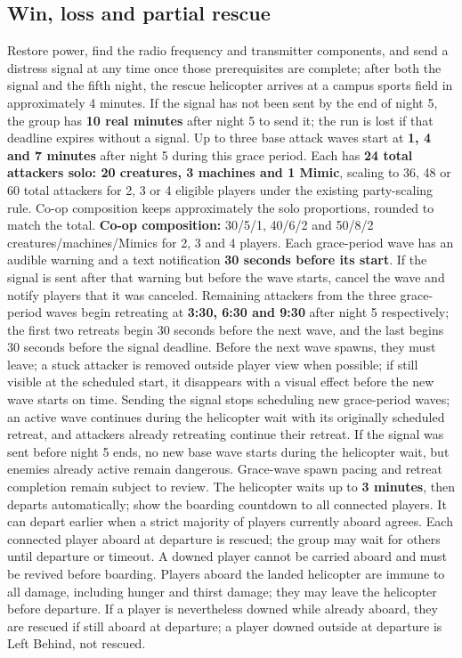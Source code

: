 \subsection{Win, loss and partial rescue}
Restore power, find the radio frequency and transmitter components, and send a distress signal at any time once those prerequisites are complete; after both the signal and the fifth night, the rescue helicopter arrives at a campus sports field in approximately 4 minutes. If the signal has not been sent by the end of night 5, the group has \textbf{10 real minutes} after night 5 to send it; the run is lost if that deadline expires without a signal. Up to three base attack waves start at \textbf{1, 4 and 7 minutes} after night 5 during this grace period. Each has \textbf{24 total attackers solo: 20 creatures, 3 machines and 1 Mimic}, scaling to 36, 48 or 60 total attackers for 2, 3 or 4 eligible players under the existing party-scaling rule. Co-op composition keeps approximately the solo proportions, rounded to match the total. \textbf{Co-op composition:} 30/5/1, 40/6/2 and 50/8/2 creatures/machines/Mimics for 2, 3 and 4 players. Each grace-period wave has an audible warning and a text notification \textbf{30 seconds before its start}. If the signal is sent after that warning but before the wave starts, cancel the wave and notify players that it was canceled. Remaining attackers from the three grace-period waves begin retreating at \textbf{3:30, 6:30 and 9:30} after night 5 respectively; the first two retreats begin 30 seconds before the next wave, and the last begins 30 seconds before the signal deadline. Before the next wave spawns, they must leave; a stuck attacker is removed outside player view when possible; if still visible at the scheduled start, it disappears with a visual effect before the new wave starts on time. Sending the signal stops scheduling new grace-period waves; an active wave continues during the helicopter wait with its originally scheduled retreat, and attackers already retreating continue their retreat. If the signal was sent before night 5 ends, no new base wave starts during the helicopter wait, but enemies already active remain dangerous. Grace-wave spawn pacing and retreat completion remain subject to review. The helicopter waits up to \textbf{3 minutes}, then departs automatically; show the boarding countdown to all connected players. It can depart earlier when a strict majority of players currently aboard agrees. Each connected player aboard at departure is rescued; the group may wait for others until departure or timeout. A downed player cannot be carried aboard and must be revived before boarding. Players aboard the landed helicopter are immune to all damage, including hunger and thirst damage; they may leave the helicopter before departure. If a player is nevertheless downed while already aboard, they are rescued if still aboard at departure; a player downed outside at departure is Left Behind, not rescued.

